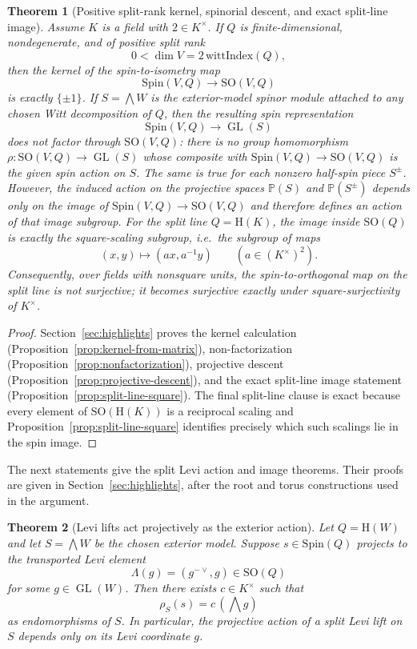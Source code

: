\documentclass{birkjour}
\theoremstyle{plain}
\newtheorem{theorem}{Theorem}[section]
\theoremstyle{definition}
\theoremstyle{remark}
\numberwithin{equation}{section}
\newcommand{\Spin}{\mathrm{Spin}}
\newcommand{\SO}{\mathrm{SO}}
\newcommand{\Hyp}{\mathrm{H}}
\begin{document}
\begin{theorem}[Positive split-rank kernel, spinorial descent, and exact split-line image]
\label{thm:kernel-nonfactor-split-line}
Assume $K$ is a field with $2\in K^\times$. If $Q$ is finite-dimensional,
nondegenerate, and of positive split rank
\[
  0<\dim V = 2\,\mathrm{wittIndex}(Q),
\]
then the kernel of the spin-to-isometry map
\[
  \Spin(V,Q) \to \SO(V,Q)
\]
is exactly $\{\pm1\}$. If $S=\bigwedge W$ is the exterior-model spinor module
attached to any chosen Witt decomposition of $Q$, then the resulting spin
representation
\[
  \Spin(V,Q) \to \operatorname{GL}(S)
\]
does not factor through $\SO(V,Q)$: there is no group homomorphism
$\rho:\SO(V,Q)\to \operatorname{GL}(S)$ whose composite with
$\Spin(V,Q)\to\SO(V,Q)$ is the given spin action on $S$. The same is true for
each nonzero half-spin piece $S^\pm$. However, the induced action on the
projective spaces $\mathbb{P}(S)$ and $\mathbb{P}(S^\pm)$ depends only on the
image of $\Spin(V,Q)\to\SO(V,Q)$ and therefore defines an action of that image
subgroup. For the split line $Q=\Hyp(K)$, the image inside $\SO(Q)$ is
exactly the square-scaling subgroup, i.e.\ the subgroup of maps
\[
  (x,y)\longmapsto (a x, a^{-1} y)
  \qquad (a\in (K^\times)^2).
\]
Consequently, over fields with nonsquare units, the spin-to-orthogonal map on
the split line is not surjective; it becomes surjective exactly under
square-surjectivity of \(K^\times\).
\end{theorem}

\begin{proof}
Section~\ref{sec:highlights} proves the kernel calculation
(Proposition~\ref{prop:kernel-from-matrix}), non-factorization
(Proposition~\ref{prop:nonfactorization}), projective descent
(Proposition~\ref{prop:projective-descent}), and the exact split-line image
statement (Proposition~\ref{prop:split-line-square}). The final split-line
clause is exact because every element of $\SO(\Hyp(K))$ is a reciprocal
scaling and Proposition~\ref{prop:split-line-square} identifies precisely which
such scalings lie in the spin image.
\end{proof}

The next statements give the split Levi action and image theorems. Their proofs
are given in Section~\ref{sec:highlights}, after the root and torus
constructions used in the argument.

\begin{theorem}[Levi lifts act projectively as the exterior action]
\label{thm:levi-projective-exterior}
Let $Q=\Hyp(W)$ and let $S=\bigwedge W$ be the chosen exterior model.
Suppose $s\in \Spin(Q)$ projects to the transported Levi element
\[
  \Lambda(g)=(g^{-{\vee}},g)\in \SO(Q)
\]
for some $g\in \operatorname{GL}(W)$. Then there exists $c\in K^\times$ such that
\[
  \rho_S(s)=c\,(\bigwedge g)
\]
as endomorphisms of $S$. In particular, the projective action of a split Levi
lift on $S$ depends only on its Levi coordinate $g$.
\end{theorem}
\end{document}
